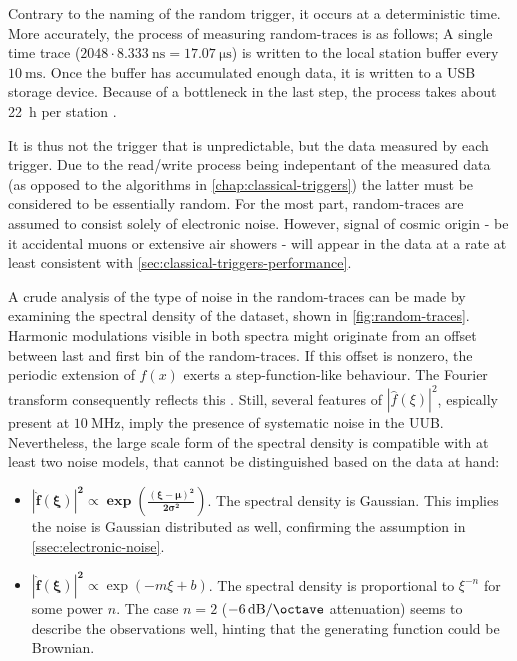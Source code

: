 Contrary to the naming of the random trigger, it occurs at a deterministic time. More accurately, the process of measuring random-traces is as follows;
A single time trace ($2048\cdot\SI{8.333}{\nano\second} = \SI{17.07}{\micro\second}$) is written to the local station buffer every $\SI{10}{\milli\second}$. Once
the buffer has accumulated enough data, it is written to a USB storage device. Because of a bottleneck in the last step, the process takes about \SI{22}{\hour}
per station \cite{nitzCorrespondence}.

It is thus not the trigger that is unpredictable, but the data measured by each trigger. Due to the read/write process being indepentant of the measured data
(as opposed to the algorithms in \autoref{chap:classical-triggers}) the latter must be considered to be essentially random. For the most part, random-traces are 
assumed to consist solely of electronic noise. However, signal of cosmic origin - be it accidental muons or extensive air showers - will appear in the data at a
rate at least consistent with \autoref{sec:classical-triggers-performance}.

A crude analysis of the type of noise in the random-traces can be made by examining the spectral density of the dataset, shown in \autoref{fig:random-traces}.
Harmonic modulations visible in both spectra might originate from an offset between last and first bin of the random-traces. If this offset is nonzero, the 
periodic extension of $f(x)$ exerts a step-function-like behaviour. The Fourier transform consequently reflects this \cite{burrows1990fourier}. Still, several
features of $| \hat{f}(\xi) | ^{2}$, espically present at $\SI{10}{\mega\hertz}$, imply the presence of systematic noise in the UUB. Nevertheless, the large scale 
form of the spectral density is compatible with at least two noise models, that cannot be distinguished based on the data at hand:

\begin{itemize}
	\item  $\mathbf{| \hat{f}(\xi) | ^{2} \propto \exp\left(\frac{(\xi - \mu)^2}{2\sigma^2}\right)}$. The spectral density is Gaussian. This implies the noise is 
	Gaussian distributed as well, confirming the assumption in \autoref{ssec:electronic-noise}.
	\item $\mathbf{| \hat{f}(\xi) | ^{2} \propto} \exp\left(-m\xi + b\right)$. The spectral density is proportional to $\xi^{-n}$ for some power $n$. The case 
    $n = 2$ ($\SI[per-mode=symbol]{-6}{\deci\bel\per\octave}$ attenuation) seems to describe the observations well, hinting that the generating function could be 
    Brownian.

\end{itemize}

